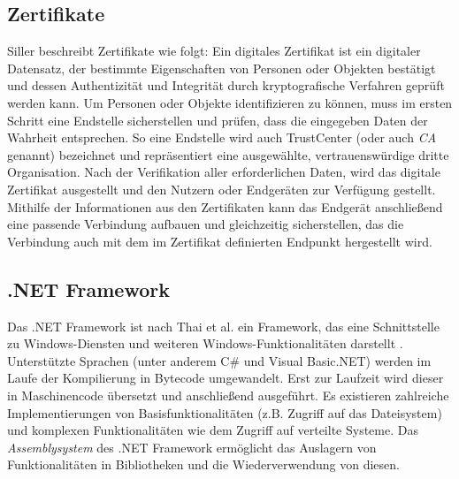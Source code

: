         \subsection{Zertifikate}
        Siller beschreibt Zertifikate wie folgt:
        \glqq Ein digitales Zertifikat ist ein digitaler Datensatz, der bestimmte Eigenschaften von Personen oder Objekten bestätigt und dessen Authentizität und Integrität durch kryptografische Verfahren geprüft werden kann.\grqq{} \cite{siller_2018}
        Um Personen oder Objekte identifizieren zu können, muss im ersten Schritt eine Endstelle sicherstellen und prüfen, dass die eingegeben Daten der Wahrheit entsprechen. So eine Endstelle wird auch TrustCenter (oder auch \emph{\ac{CA}} genannt) bezeichnet und repräsentiert eine ausgewählte, vertrauenswürdige dritte Organisation. Nach der Verifikation aller erforderlichen Daten, wird das digitale Zertifikat ausgestellt und den Nutzern oder Endgeräten zur Verfügung gestellt. Mithilfe der Informationen aus den Zertifikaten kann das Endgerät anschließend eine passende Verbindung aufbauen und gleichzeitig sicherstellen, das die Verbindung auch mit dem im Zertifikat definierten Endpunkt hergestellt wird.
    
    \subsection{.NET Framework}
        Das .NET Framework ist nach Thai et al. ein Framework, das eine Schnittstelle zu Windows-Diensten und weiteren Windows-Funktionalitäten darstellt \cite{thai2003net}.
        Unterstützte Sprachen (unter anderem C\# und Visual Basic.NET) werden im Laufe der Kompilierung in Bytecode umgewandelt. Erst zur Laufzeit wird dieser in Maschinencode übersetzt und anschließend ausgeführt. Es existieren zahlreiche Implementierungen von Basisfunktionalitäten (z.B. Zugriff auf das Dateisystem) und komplexen Funktionalitäten wie dem Zugriff auf verteilte Systeme. 
        Das \emph{Assemblysystem} des .NET Framework ermöglicht das Auslagern von Funktionalitäten in Bibliotheken und die Wiederverwendung von diesen.
        
